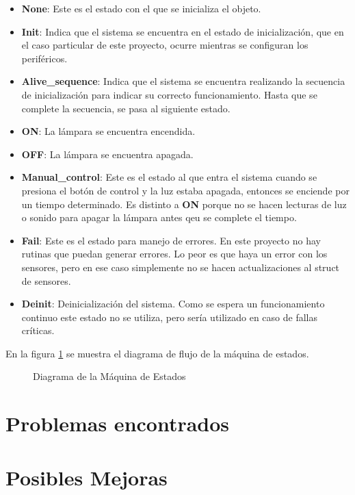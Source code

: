 \begin{itemize}
\item \textbf{None}: Este es el estado con el que se inicializa el objeto. 
\item \textbf{Init}: Indica que el sistema se encuentra en el estado de inicialización, que en el
  caso particular de este proyecto, ocurre mientras se configuran los periféricos.
\item \textbf{Alive\_sequence}: Indica que el sistema se encuentra realizando la secuencia de
  inicialización para indicar su correcto funcionamiento. Hasta que se complete la secuencia, se
  pasa al siguiente estado. 
\item \textbf{ON}: La lámpara se encuentra encendida.
\item \textbf{OFF}: La lámpara se encuentra apagada.
\item \textbf{Manual\_control}: Este es el estado al que entra el sistema cuando se presiona el
  botón de control y la luz estaba apagada, entonces se enciende por un tiempo determinado. Es
  distinto a \textbf{ON} porque no se hacen lecturas de luz o sonido para apagar la lámpara antes
  qeu se complete el tiempo.
\item \textbf{Fail}: Este es el estado para manejo de errores. En este proyecto no hay rutinas que
  puedan generar errores. Lo peor es que haya un error con los sensores, pero en ese caso simplemente
  no se hacen actualizaciones al struct de sensores. 
\item \textbf{Deinit}: Deinicialización del sistema. Como se espera un funcionamiento continuo este
  estado no se utiliza, pero sería utilizado en caso de fallas críticas. 
\end{itemize}

En la figura \ref{fig:state_machine} se muestra el diagrama de flujo de la máquina de estados. 

\begin{figure}
\centering
\scalebox{.4}{}
\caption{Diagrama de la Máquina de Estados}
\label{fig:state_machine}
\end{figure}



\newpage
\section{Problemas encontrados}



\newpage
\section{Posibles Mejoras}


\newpage


%
%
